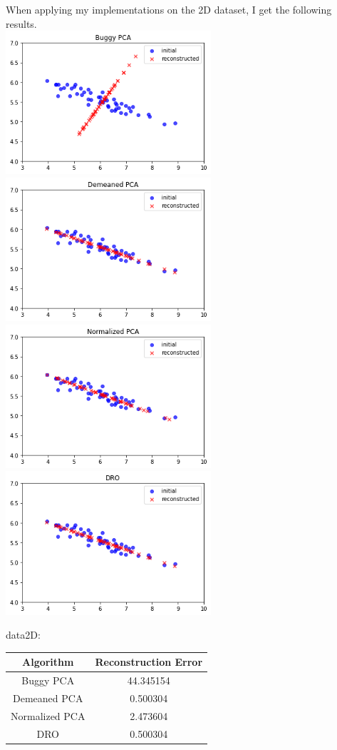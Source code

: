 \documentclass[a4paper]{article}
\newcounter{thm}
\theoremstyle{definition}
\newenvironment{soln}{
	\leavevmode\color{blue}\ignorespaces
}{}
\begin{document}
\begin{itemize}
\begin{soln}
	When applying my implementations on the 2D dataset, I get the following results. \\
	\includegraphics[width=3in]{2d_buggy}
	\includegraphics[width=3in]{2d_demeaned}
	\includegraphics[width=3in]{2d_normalized}
	\includegraphics[width=3in]{2d_dro}
	\begin{center}
		data2D: 
		\begin{tabular}{ c  c }
			Algorithm & Reconstruction Error \\
			\hline
			Buggy PCA & 44.345154 \\
			Demeaned PCA & 0.500304 \\
			Normalized PCA & 2.473604 \\
			DRO & 0.500304 \\
		\end{tabular}
	\end{center}
	

\end{soln}
\end{itemize}
\end{document}
